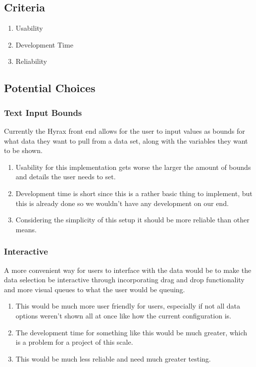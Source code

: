 \documentclass[onecolumn, draftclsnofoot,10pt, compsoc]{IEEEtran}
\begin{document}
\subsection{Criteria}
\begin{enumerate}
\item Usability
\item Development Time
\item Reliability
\end{enumerate}

\subsection{Potential Choices}

\subsubsection{Text Input Bounds}
Currently the Hyrax front end allows for the user to input values as bounds for what data they want to pull from a data set, along with the variables they want to be shown.
\begin{enumerate}
\item Usability for this implementation gets worse the larger the amount of bounds and details the user needs to set.
\item Development time is short since this is a rather basic thing to implement, but this is already done so we wouldn't have any development on our end.
\item Considering the simplicity of this setup it should be more reliable than other means.
\end{enumerate}

\subsubsection{Interactive}
A more convenient way for users to interface with the data would be to make the data selection be interactive through incorporating drag and drop functionality and more visual queues to what the user would be queuing.
\begin{enumerate}
\item This would be much more user friendly for users, especially if not all data options weren't shown all at once like how the current configuration is.
\item The development time for something like this would be much greater, which is a problem for a project of this scale.
\item This would be much less reliable and need much greater testing.
\end{enumerate}
\end{document}
